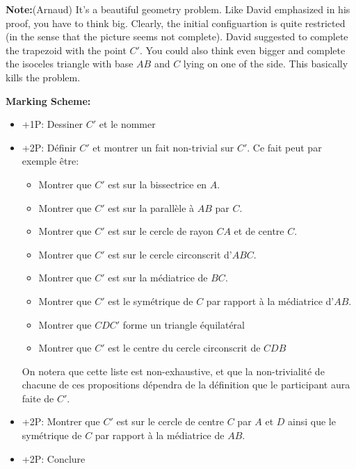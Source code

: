 {\textbf{Note:}(Arnaud) It's a beautiful geometry problem. Like David emphasized in his proof, you have to think big. Clearly, the initial configuartion is quite restricted (in the sense that the picture seems not complete). David suggested to complete the trapezoid with the point $C'$. You could also think even bigger and complete the isoceles triangle with base $AB$ and $C$ lying on one of the side. This basically kills the problem.

\textbf{Marking Scheme:}
\begin{itemize}
    \item +1P: Dessiner $C'$ et le nommer
    \item +2P: Définir $C'$ et montrer un fait non-trivial sur $C'$. Ce fait peut par exemple être:
    \begin{itemize}
        \item Montrer que $C'$ est sur la bissectrice en $A$.
        \item Montrer que $C'$ est sur la parallèle à $AB$ par $C$.
        \item Montrer que $C'$ est sur le cercle de rayon $CA$ et de centre $C$.
        \item Montrer que $C'$ est sur le cercle circonscrit d'$ABC$.
        \item Montrer que $C'$ est sur la médiatrice de $BC$.
        \item Montrer que $C'$ est le symétrique de $C$ par rapport à la médiatrice d'$AB$.
        \item Montrer que $CDC'$ forme un triangle équilatéral
        \item Montrer que $C'$ est le centre du cercle circonscrit de $CDB$
    \end{itemize}
    On notera que cette liste est non-exhaustive, et que la non-trivialité de chacune de ces propositions dépendra de la définition que le participant aura faite de $C'$.
    \item +2P: Montrer que $C'$ est sur le cercle de centre $C$ par $A$ et $D$ ainsi que le symétrique de $C$ par rapport à la médiatrice de $AB$.
    \item +2P: Conclure
\end{itemize}
}
